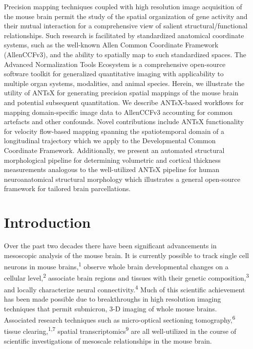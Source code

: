 \documentclass[
  12pt,
]{article}
\begin{document}
Precision mapping techniques coupled with high resolution image
acquisition of the mouse brain permit the study of the spatial
organization of gene activity and their mutual interaction for a
comprehensive view of salient structural/functional relationships. Such
research is facilitated by standardized anatomical coordinate systems,
such as the well-known Allen Common Coordinate Framework (AllenCCFv3),
and the ability to spatially map to such standardized spaces. The
Advanced Normalization Tools Ecosystem is a comprehensive open-source
software toolkit for generalized quantitative imaging with applicability
to multiple organ systems, modalities, and animal species. Herein, we
illustrate the utility of ANTsX for generating precision spatial
mappings of the mouse brain and potential subsequent quantitation. We
describe ANTsX-based workflows for mapping domain-specific image data to
AllenCCFv3 accounting for common artefacts and other confounds. Novel
contributions include ANTsX functionality for velocity flow-based
mapping spanning the spatiotemporal domain of a longitudinal trajectory
which we apply to the Developmental Common Coordinate Framework.
Additionally, we present an automated structural morphological pipeline
for determining volumetric and cortical thickness measurements analogous
to the well-utilized ANTsX pipeline for human neuroanatomical structural
morphology which illustrates a general open-source framework for
tailored brain parcellations.

\clearpage

\hypertarget{introduction}{%
\section{Introduction}\label{introduction}}

Over the past two decades there have been significant advancements in
mesoscopic analysis of the mouse brain. It is currently possible to
track single cell neurons in mouse brains,\textsuperscript{1} observe
whole brain developmental changes on a cellular
level,\textsuperscript{2} associate brain regions and tissues with their
genetic composition,\textsuperscript{3} and locally characterize neural
connectivity.\textsuperscript{4} Much of this scientific achievement has
been made possible due to breakthroughs in high resolution imaging
techniques that permit submicron, 3-D imaging of whole mouse brains.
Associated research techniques such as micro-optical sectioning
tomography,\textsuperscript{6} tissue clearing,\textsuperscript{1,7}
spatial transcriptomics\textsuperscript{9} are all well-utilized in the
course of scientific investigations of mesoscale relationships in the
mouse brain.
\end{document}
